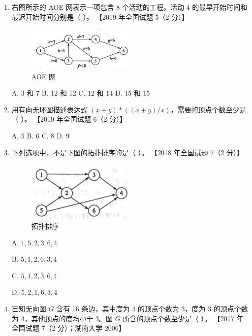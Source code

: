 \documentclass[lang=cn,newtx,10pt,scheme=chinese]{../../elegantbook}
\begin{document}
\begin{enumerate}
    \item 右图所示的 AOE 网表示一项包含 8 个活动的工程。活动 4 的最早开始时间和最迟开始时间分别是（ ）。  
    【2019 年全国试题 5（2 分）】  
    \begin{figure}[h!]
            \centering
            \includegraphics[width=0.5\textwidth]{../../figure/exercisePicPDF/chapter7/7-1.pdf}
            \caption{AOE 网}
    \end{figure}

    A. 3 和 7 \quad B. 12 和 12 \quad C. 12 和 14 \quad D. 15 和 15  

    \item 用有向无环图描述表达式 $(x + y) \ast ((x + y) / x)$，需要的顶点个数至少是（ ）。  
    【2019 年全国试题 6（2 分）】  

    A. 5 \quad B. 6  C. 8 \quad D. 9    

    \item 下列选项中，不是下图的拓扑排序的是（ ）。  
    【2018 年全国试题 7（2 分）】  

    \begin{figure}[h!]
            \centering
            \includegraphics[width=0.5\textwidth]{../../figure/exercisePicPDF/chapter7/7-3.pdf}
            \caption{拓扑排序}
    \end{figure}

    A. $1, 5, 2, 3, 6, 4$  

    B. $5, 1, 2, 6, 3, 4$  

    C. $5, 1, 2, 3, 6, 4$  

    D. $5, 2, 1, 6, 3, 4$  

    \item 已知无向图 $G$ 含有 16 条边，其中度为 4 的顶点个数为 3，度为 3 的顶点个数为 4，其他顶点的度均小于 3。图 $G$ 所含的顶点个数至少是（ ）。  
    【2017 年全国试题 7（2 分）；湖南大学 2006】 


\end{enumerate}
\end{document}

